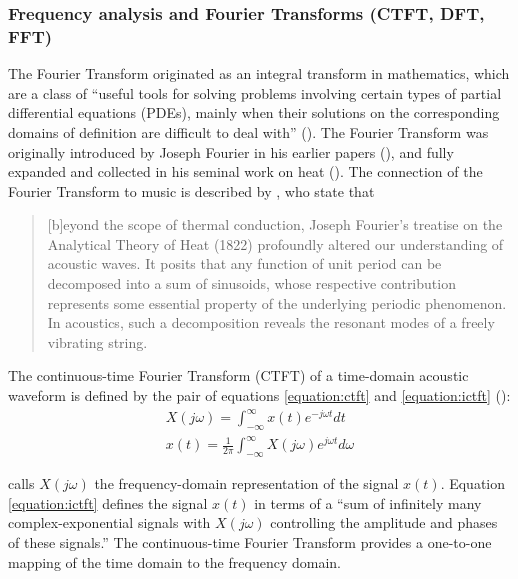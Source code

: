 \documentclass[report.tex]{subfiles}
\begin{document}
\subsubsection{Frequency analysis and Fourier Transforms (CTFT, DFT, FFT)}
\label{sec:freqanal}

The Fourier Transform originated as an integral transform in mathematics, which are a class of ``useful tools for solving problems involving certain types of partial differential equations (PDEs), mainly when their solutions on the corresponding domains of definition are difficult to deal with'' (\cite{fourierhistory}). The Fourier Transform was originally introduced by Joseph Fourier in his earlier papers (\cite{fourierhist1, fourierhist2}), and fully expanded and collected in his seminal work on heat (\cite{fourierheat}). The connection of the Fourier Transform to music is described by \textcite{fouriermusic}, who state that

\begin{quote}
	[b]eyond the scope of thermal conduction, Joseph Fourier's treatise on the Analytical Theory of Heat (1822) profoundly altered our understanding of acoustic waves. It posits that any function of unit period can be decomposed into a sum of sinusoids, whose respective contribution represents some essential property of the underlying periodic phenomenon. In acoustics, such a decomposition reveals the resonant modes of a freely vibrating string.
\end{quote}

The continuous-time Fourier Transform (CTFT) of a time-domain acoustic waveform is defined by the pair of equations \ref{equation:ctft} and \ref{equation:ictft} (\cite[Chapter~11]{dspfirst}):
\begin{align}
	X(j\omega) = \int_{-\infty}^{\infty}{x(t)e^{-j\omega t}\mathit{dt}} \tag{1}\label{equation:ctft} \\
	x(t) = \frac{1}{2\pi}\int_{-\infty}^{\infty}{X(j\omega)e^{j\omega t}\mathit{d\omega}} \tag{2}\label{equation:ictft}
\end{align}

\textcite{dspfirst} calls $X(j\omega)$ the frequency-domain representation of the signal $x(t)$. Equation \ref{equation:ictft} defines the signal $x(t)$ in terms of a ``sum of infinitely many complex-exponential signals with $X(j\omega)$ controlling the amplitude and phases of these signals.'' The continuous-time Fourier Transform provides a one-to-one mapping of the time domain to the frequency domain.
\end{document}
